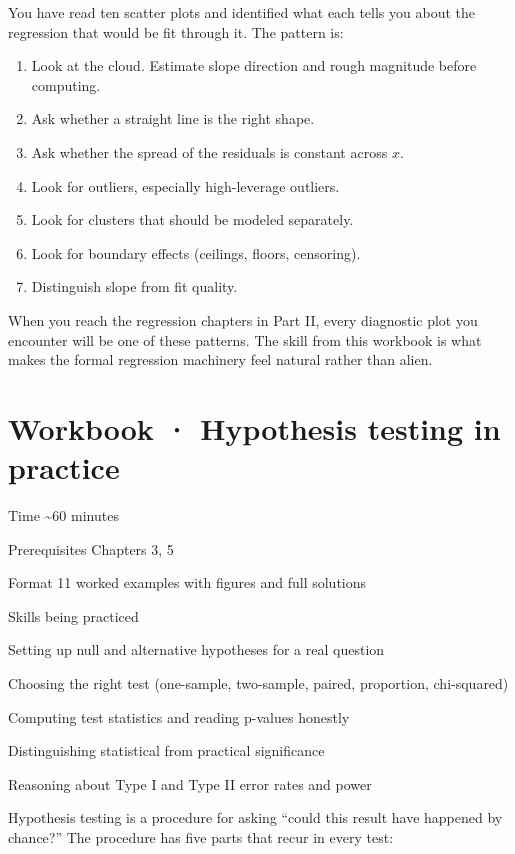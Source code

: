 \documentclass[
  letterpaper,
  11pt,
  twoside,
  openany]{scrbook}
\providecommand{\tightlist}{%
  \setlength{\itemsep}{0pt}\setlength{\parskip}{0pt}}
\begin{document}
You have read ten scatter plots and identified what each tells you about
the regression that would be fit through it. The pattern is:

\begin{enumerate}
\def\labelenumi{\arabic{enumi}.}
\tightlist
\item
  Look at the cloud. Estimate slope direction and rough magnitude before
  computing.
\item
  Ask whether a straight line is the right shape.
\item
  Ask whether the spread of the residuals is constant across \(x\).
\item
  Look for outliers, especially high-leverage outliers.
\item
  Look for clusters that should be modeled separately.
\item
  Look for boundary effects (ceilings, floors, censoring).
\item
  Distinguish slope from fit quality.
\end{enumerate}

When you reach the regression chapters in Part II, every diagnostic plot
you encounter will be one of these patterns. The skill from this
workbook is what makes the formal regression machinery feel natural
rather than alien.

\chapter{Workbook · Hypothesis testing in
practice}\label{workbook-hypothesis-testing-in-practice}

{Time} {\textasciitilde60 minutes}

{Prerequisites} {Chapters 3, 5}

{Format} {11 worked examples with figures and full solutions}

{Skills being practiced}

Setting up null and alternative hypotheses for a real question

Choosing the right test (one-sample, two-sample, paired, proportion,
chi-squared)

Computing test statistics and reading p-values honestly

Distinguishing statistical from practical significance

Reasoning about Type I and Type II error rates and power

Hypothesis testing is a procedure for asking ``could this result have
happened by chance?'' The procedure has five parts that recur in every
test:
\end{document}
